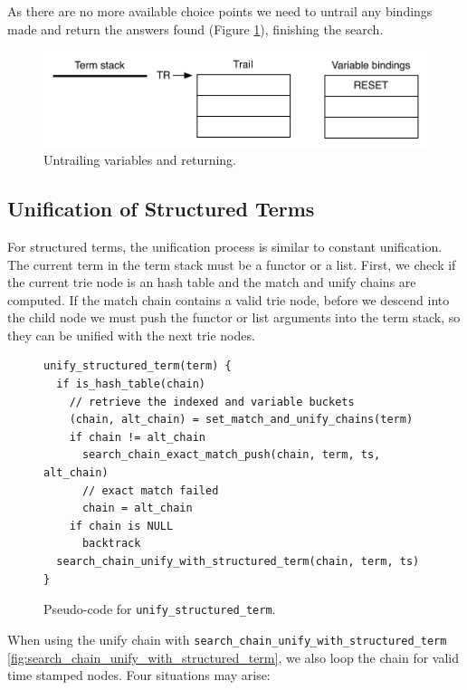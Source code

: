 As there are no more available choice points we need to untrail any bindings made and return
the answers found (Figure \ref{fig:collect_ex6}), finishing the search.

\begin{figure}[H]
  \centering
    \includegraphics[scale=0.6]{collect_ex6.pdf}
  \caption{Untrailing variables and returning.}
  \label{fig:collect_ex6}
\end{figure}

\subsection{Unification of Structured Terms}

For structured terms, the unification process is similar to constant unification. The
current term in the term stack must be a functor or a list. First, we check if the current
trie node is an hash table and the match and unify chains are computed.
If the match chain contains a valid trie node, before we descend into the child
node we must push the functor or list arguments into the term stack, so they can
be unified with the next trie nodes.

\begin{figure}[ht]
\begin{Verbatim}
unify_structured_term(term) {
  if is_hash_table(chain)
    // retrieve the indexed and variable buckets
    (chain, alt_chain) = set_match_and_unify_chains(term)
    if chain != alt_chain
      search_chain_exact_match_push(chain, term, ts, alt_chain)
      // exact match failed
      chain = alt_chain
    if chain is NULL
      backtrack
  search_chain_unify_with_structured_term(chain, term, ts)
}
\end{Verbatim}
\caption{Pseudo-code for \texttt{unify\_structured\_term}.}
\label{fig:unify_structured_term}
\end{figure}

When using the unify chain with \texttt{search\_chain\_unify\_with\_structured\_term}
\ref{fig:search_chain_unify_with_structured_term},
we also loop the chain for valid time stamped nodes.
Four situations may arise:

